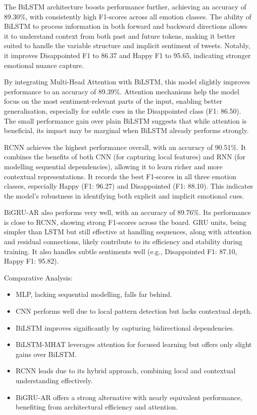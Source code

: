 \documentclass{article}
\begin{document}
The BiLSTM architecture boosts performance further, achieving an accuracy of 89.30\%, with consistently high F1-scores across all emotion classes. The ability of BiLSTM to process information in both forward and backward directions allows it to understand context from both past and future tokens, making it better suited to handle the variable structure and implicit sentiment of tweets. Notably, it improves Disappointed F1 to 86.37 and Happy F1 to 95.65, indicating stronger emotional nuance capture.

By integrating Multi-Head Attention with BiLSTM, this model slightly improves performance to an accuracy of 89.39\%. Attention mechanisms help the model focus on the most sentiment-relevant parts of the input, enabling better generalisation, especially for subtle cues in the Disappointed class (F1: 86.50). The small performance gain over plain BiLSTM suggests that while attention is beneficial, its impact may be marginal when BiLSTM already performs strongly.

RCNN achieves the highest performance overall, with an accuracy of 90.51\%. It combines the benefits of both CNN (for capturing local features) and RNN (for modelling sequential dependencies), allowing it to learn richer and more contextual representations. It records the best F1-scores in all three emotion classes, especially Happy (F1: 96.27) and Disappointed (F1: 88.10). This indicates the model's robustness in identifying both explicit and implicit emotional cues.

BiGRU-AR also performs very well, with an accuracy of 89.76\%. Its performance is close to RCNN, showing strong F1-scores across the board. GRU units, being simpler than LSTM but still effective at handling sequences, along with attention and residual connections, likely contribute to its efficiency and stability during training. It also handles subtle sentiments well (e.g., Disappointed F1: 87.10, Happy F1: 95.82).

Comparative Analysis:
\begin{itemize}
\item MLP, lacking sequential modelling, falls far behind.
\item CNN performs well due to local pattern detection but lacks contextual depth.
\item BiLSTM improves significantly by capturing bidirectional dependencies.
\item BiLSTM-MHAT leverages attention for focused learning but offers only slight gains over BiLSTM.
\item RCNN leads due to its hybrid approach, combining local and contextual understanding effectively.
\item BiGRU-AR offers a strong alternative with nearly equivalent performance, benefiting from architectural efficiency and attention.
\end{itemize}
\end{document}
